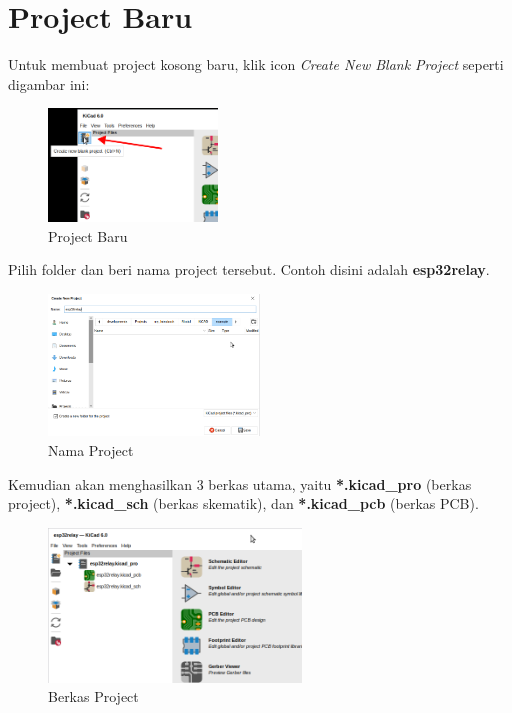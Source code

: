 \documentclass[12pt]{book}
\begin{document}
	\newpage
	\section{Project Baru}

	Untuk membuat project kosong baru, klik icon \textit{Create New Blank Project} seperti digambar ini:

	\begin{figure}[!ht]
		\centering
		\includegraphics[width=0.4\textwidth]{images/main/kicad_new_0}
		\caption{Project Baru}
	\end{figure}

	Pilih folder dan beri nama project tersebut. Contoh disini adalah \textbf{esp32relay}.

	\begin{figure}[!ht]
		\centering
		\includegraphics[width=0.5\textwidth]{images/main/kicad_new_1}
		\caption{Nama Project}
	\end{figure}

	Kemudian akan menghasilkan 3 berkas utama, yaitu \textbf{*.kicad\_pro} (berkas project),
	\textbf{*.kicad\_sch} (berkas skematik), dan \textbf{*.kicad\_pcb} (berkas PCB).

	\begin{figure}[!ht]
		\centering
		\includegraphics[width=0.6\textwidth]{images/main/kicad_new_2}
		\caption{Berkas Project}
	\end{figure}
\end{document}
